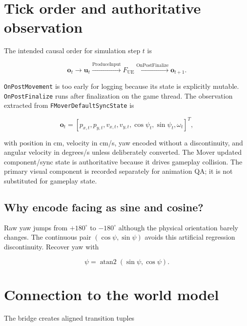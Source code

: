 \documentclass[11pt]{article}
\begin{document}
\section{Tick order and authoritative observation}\label{sec:state}

The intended causal order for simulation step $t$ is

\begin{equation}
  \mathbf{o}_t \longrightarrow \mathbf{u}_t
  \xrightarrow{\mathrm{ProduceInput}} F_{\mathrm{UE}}
  \xrightarrow{\mathrm{OnPostFinalize}} \mathbf{o}_{t+1}.
\end{equation}

\texttt{OnPostMovement} is too early for logging because its state is explicitly mutable.
\texttt{OnPostFinalize} runs after finalization on the game thread. The observation extracted from
\texttt{FMoverDefaultSyncState} is

\begin{equation}
  \mathbf{o}_t =
  \left[
  p_{x,t},p_{y,t},v_{x,t},v_{y,t},\cos\psi_t,\sin\psi_t,\omega_t
  \right]^T,
\end{equation}

with position in cm, velocity in cm/s, yaw encoded without a discontinuity, and angular velocity in
degrees/s unless deliberately converted. The Mover updated component/sync state is authoritative
because it drives gameplay collision. The primary visual component is recorded separately for
animation QA; it is not substituted for gameplay state.

\subsection*{Why encode facing as sine and cosine?}

Raw yaw jumps from $+180^\circ$ to $-180^\circ$ although the physical orientation barely changes.
The continuous pair $(\cos\psi,\sin\psi)$ avoids this artificial regression discontinuity. Recover
yaw with

\begin{equation}
  \psi = \operatorname{atan2}(\sin\psi,\cos\psi).
\end{equation}

\section{Connection to the world model}\label{sec:model}

The bridge creates aligned transition tuples
\end{document}
